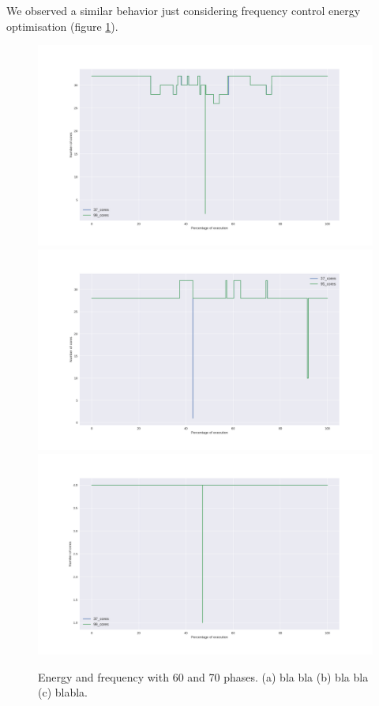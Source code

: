 We observed a similar behavior just considering frequency control energy optimisation (figure \ref{fig:freq_control}).

\begin{figure}[h]
\includegraphics[width=\columnwidth]{phases/figures/signals/completo_black_3_freq_signals_cmp.png}
\includegraphics[width=\columnwidth]{phases/figures/signals/completo_bodytrack_3_freq_signals_cmp.png}
\includegraphics[width=\columnwidth]{phases/figures/signals/completo_canneal_4_freq_signals_cmp.png}
\caption{Energy and frequency with 60 and 70 phases. (a) bla bla (b) bla bla (c) blabla.}
    \label{fig:freq_control}
\end{figure}

